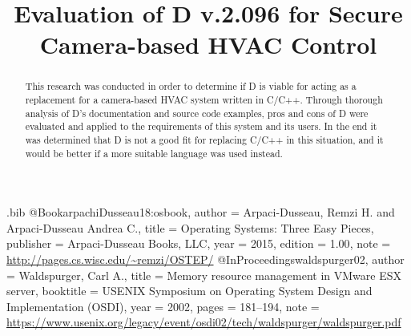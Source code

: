 \usepackage{filecontents}

\begin{filecontents}{\jobname.bib}
@Book{arpachiDusseau18:osbook,
  author =       {Arpaci-Dusseau, Remzi H. and Arpaci-Dusseau Andrea C.},
  title =        {Operating Systems: Three Easy Pieces},
  publisher =    {Arpaci-Dusseau Books, LLC},
  year =         2015,
  edition =      {1.00},
  note =         {\url{http://pages.cs.wisc.edu/~remzi/OSTEP/}}
}
@InProceedings{waldspurger02,
  author =       {Waldspurger, Carl A.},
  title =        {Memory resource management in {VMware ESX} server},
  booktitle =    {USENIX Symposium on Operating System Design and
                  Implementation (OSDI)},
  year =         2002,
  pages =        {181--194},
  note =         {\url{https://www.usenix.org/legacy/event/osdi02/tech/waldspurger/waldspurger.pdf}}}
\end{filecontents}



\date{}

\title{\Large \bf Evaluation of D v.2.096 for Secure Camera-based HVAC Control}

\maketitle

\begin{abstract}
This research was conducted in order to determine if D is viable for 
acting as a replacement for a camera-based HVAC system written in C/C++. Through
thorough analysis of D's documentation and source code examples, pros and cons
of D were evaluated and applied to the requirements of this system and its
users. In the end it was determined that D is not a good fit for replacing C/C++
in this situation, and it would be better if a more suitable language was used
instead.

\end{abstract}


